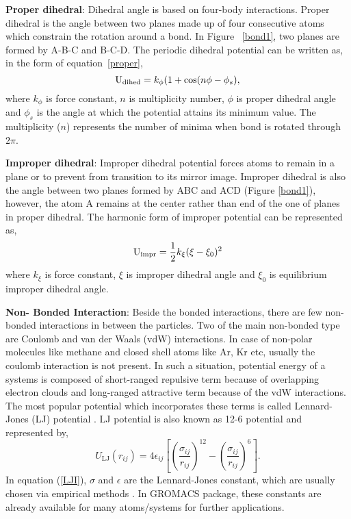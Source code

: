 {\bf Proper dihedral}: 
Dihedral angle is based on four-body interactions. Proper dihedral is the angle between two planes made up of four consecutive atoms which constrain the rotation around a bond. In Figure ~\ref{bond1}, two planes are formed by A-B-C and B-C-D. The periodic dihedral potential can be written as, in the form of equation~\ref{proper},
\begin{equation}\label{proper}
{\rm U}_{\rm dihed} = k_{\phi} (1 + \cos(n\phi - \phi_s),
\end{equation}
where $k_{\phi}$ is force constant, $n$ is multiplicity number, $\phi$ is proper dihedral angle and $\phi_s$ is the angle at which the potential attains its minimum value. The multiplicity ($n$) represents the number of minima when bond is rotated through $2\pi$. 

{\bf Improper dihedral}: Improper dihedral potential forces atoms to remain in a plane or to prevent from transition to its mirror image. Improper dihedral is also the angle between two planes formed by ABC and ACD (Figure \ref{bond1}), however, the atom A remains at the center rather than end of the one of planes in proper dihedral. The harmonic form of improper potential can be represented as,  
\begin{equation}
{\rm U}_{\rm impr} = \frac{1}{2} k_\xi (\xi - \xi_{0})^2 
\label{improper}
\end{equation}
where $k_\xi $ is force constant, $\xi$ is improper dihedral angle and $ \xi_0 $ is equilibrium improper dihedral angle. 

{\textbf{Non- Bonded Interaction}}: Beside the bonded interactions, there are few non-bonded interactions in between the particles. Two of the main non-bonded type are Coulomb and van der Waals (vdW) interactions. In case of non-polar molecules like methane and closed shell atoms like Ar, Kr etc, usually the coulomb interaction is not present. In such a situation, potential energy of a systems is composed of short-ranged repulsive term because of overlapping electron clouds and long-ranged attractive term because of the vdW interactions. The most popular potential which incorporates these terms is called Lennard-Jones (LJ) potential \citep{Kittel2005}. LJ potential is also known as 12-6 potential and represented by,
\begin{equation}
U_{\text{LJ}}(r_{ij}) = 4\epsilon_{ij}\left[\left(\frac{\sigma_{ij}}{r_{ij}}\right)^{12} - \left(\frac{\sigma_{ij}}{r_{ij}}\right)^6\right].
\label{LJI}
\end{equation}
In equation (\ref{LJI}), $\sigma$ and $\epsilon$ are the Lennard-Jones constant, which are usually chosen via empirical methods \citep{Ercolessi1997}. In GROMACS package, these constants are already available for many atoms/systems for further applications.  

